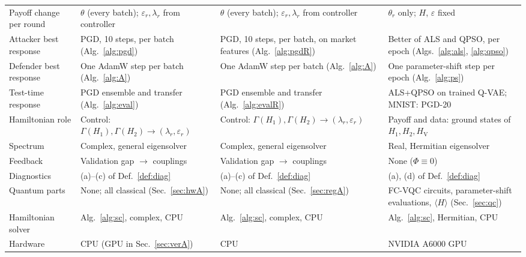 \documentclass[conference]{IEEEtran}
\newcommand{\HV}{H_{\mathrm{V}}}
\begin{document}
\begin{table}[t]
\begin{tabular}{@{}>{\raggedright\arraybackslash}p{2.0cm}>{\raggedright\arraybackslash}p{4.9cm}>{\raggedright\arraybackslash}p{4.9cm}>{\raggedright\arraybackslash}p{4.9cm}@{}}
Payoff change per round & $\theta$ (every batch); $\varepsilon_r,\lambda_r$ from controller & $\theta$ (every batch); $\varepsilon_r,\lambda_r$ from controller & $\theta_r$ only; $H$, $\varepsilon$ fixed \\
Attacker best response & PGD, 10 steps, per batch (Alg.~\ref{alg:pgd}) & PGD, 10 steps, per batch, on market features (Alg.~\ref{alg:pgdR}) & Better of ALS and QPSO, per epoch (Algs.~\ref{alg:als}, \ref{alg:qpso}) \\
Defender best response & One AdamW step per batch (Alg.~\ref{alg:A}) & One AdamW step per batch (Alg.~\ref{alg:A}) & One parameter-shift step per epoch (Alg.~\ref{alg:ps}) \\
Test-time response & PGD ensemble and transfer (Alg.~\ref{alg:eval}) & PGD ensemble and transfer (Alg.~\ref{alg:evalR}) & ALS+QPSO on trained Q-VAE; MNIST: PGD-20 \\
Hamiltonian role & Control: $\Gamma(H_1),\Gamma(H_2)\to(\lambda_r,\varepsilon_r)$ & Control: $\Gamma(H_1),\Gamma(H_2)\to(\lambda_r,\varepsilon_r)$ & Payoff and data: ground states of $H_1,H_2,\HV$ \\
Spectrum & Complex, general eigensolver & Complex, general eigensolver & Real, Hermitian eigensolver \\
Feedback & Validation gap $\to$ couplings & Validation gap $\to$ couplings & None ($\Phi\equiv0$) \\
Diagnostics & (a)--(c) of Def.~\ref{def:diag} & (a)--(c) of Def.~\ref{def:diag} & (a), (d) of Def.~\ref{def:diag} \\
Quantum parts & None; all classical (Sec.~\ref{sec:hwA}) & None; all classical (Sec.~\ref{sec:regA}) & FC-VQC circuits, parameter-shift evaluations, $\langle H\rangle$ (Sec.~\ref{sec:qc}) \\
Hamiltonian solver & Alg.~\ref{alg:sc}, complex, CPU & Alg.~\ref{alg:sc}, complex, CPU & Alg.~\ref{alg:sc}, Hermitian, CPU \\
Hardware & CPU (GPU in Sec.~\ref{sec:verA}) & CPU & NVIDIA A6000 GPU \\
\bottomrule
\end{tabular}
\end{table}
\end{document}

